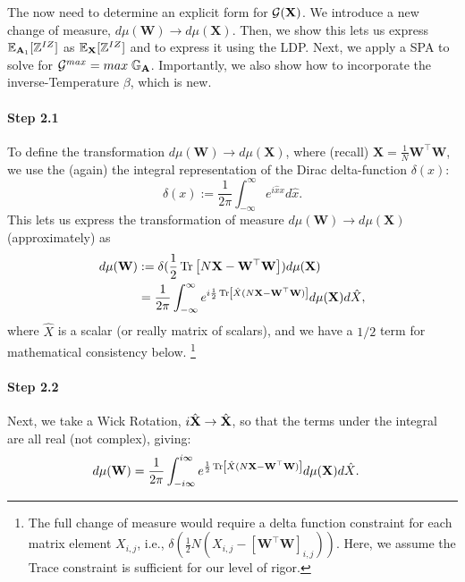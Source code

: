 The now need to  determine an explicit form for
$\mathcal{G}(\mathbf{X})$. We introduce a new change of measure, 
 $d\mu(\mathbf{W})\rightarrow d\mu(\mathbf{X})$.
Then, we show this lets us express $\mathbb{E}_{\mathbf{A}_1}[\mathbb{Z}^{IZ}]$ as $\mathbb{E}_{\mathbf{X}}[\mathbb{Z}^{IZ}]$ and to express it using the LDP.
Next, we apply a SPA to solve for $\mathcal{G}^{max}=max\;\mathbb{G}_{\mathbf{A}}$.
Importantly, we also show how to incorporate the inverse-Temperature $\beta$,
which is new.

\paragraph{Step 2.1}
To define the transformation $d\mu(\mathbf{W})\rightarrow d\mu(\mathbf{X})$,  where (recall) $\mathbf{X}=\frac{1}{N}\mathbf{W}^{\top}\mathbf{W}$,
we use the (again) the integral representation of the Dirac delta-function $\delta(x)$:
\begin{equation}
  \label{eqn:dirac}
  \delta(x):=\frac{1}{2\pi}\int_{-\infty}^{\infty} e^{i\hat{x}x} d\hat{x}.
\end{equation}
%
This lets us express the transformation of measure $d\mu(\mathbf{W})\rightarrow d\mu(\mathbf{X})$
(approximately) as
\begin{align}
\nonumber
  d\mu(\mathbf{W}) &:= \delta(\frac{1}{2}\mbox{}\operatorname{Tr}\left[N\mathbf{X}-\mathbf{W}^{\top}\mathbf{W}\right]) d\mu(\mathbf{X}) \\ 
  &= \frac{1}{2\pi}\int_{-\infty}^{\infty} e^{i\frac{1}{2}
    \mbox{}\operatorname{Tr}\left[\hat{X}(N\mathbf{X}-\mathbf{W}^{\top}\mathbf{W})\right]
  }
  d\mu(\mathbf{X})d\hat{X}  ,
\end{align}
where $\hat{X}$ is a scalar (or really matrix of scalars),
and we have a $1/2$ term for mathematical consistency below.
\footnote{The full change of measure would require a delta function constraint
for each matrix element $X_{i,j}$, i.e., 
$\delta\left(\frac{1}{2}N\left(X_{i,j}-[\mathbf{W}^{\top}\mathbf{W}]_{i,j}\right)\right)$.
Here, we assume the Trace constraint is sufficient for our level of rigor.
}



\paragraph{Step 2.2}
Next, we take a Wick Rotation, $i\hat{\mathbf{X}}\rightarrow \hat{\mathbf{X}}$, so that the terms under the integral are all real (not complex), giving:
\begin{align}
  \label{eqn:dmuX}
  d\mu(\mathbf{W}) &= \frac{1}{2\pi}\int_{-i\infty}^{i\infty} e^{\frac{1}{2}\mbox{}\operatorname{Tr}\left[\hat{X}(N\mathbf{X}-\mathbf{W}^{\top}\mathbf{W})\right]} d\mu(\mathbf{X})d\hat{X}  .
\end{align}

